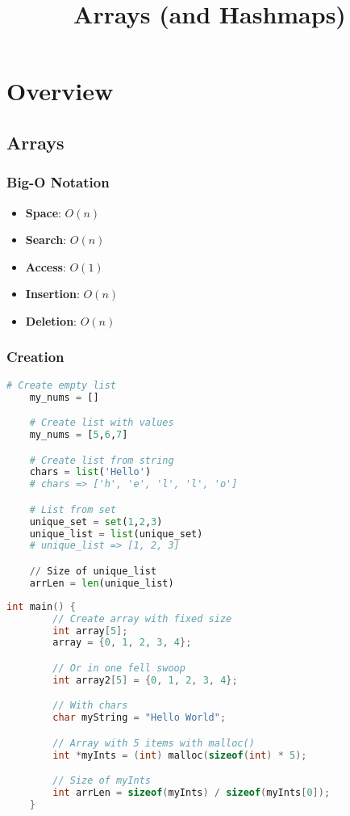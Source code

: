 \documentclass[12pt, letterpaper]{report}
\title{\textbf{\textcolor{ctpPink}{Arrays (and Hashmaps)}}}
\author{\textbf{\color{ctpGreen}{Brandon W}}}
\date{}
\begin{document}
\maketitle

\tableofcontents

\chapter{Overview}

\section{Arrays}
\subsection{Big-O Notation}
\begin{itemize}
    \item \textbf{Space}: \(O(n)\)
    \item \textbf{Search}: \(O(n)\)
    \item \textbf{Access}: \(O(1)\)
    \item \textbf{Insertion}: \(O(n)\)
    \item \textbf{Deletion}: \(O(n)\)
\end{itemize}

\subsection{Creation}

\begin{lstlisting}[language=Python,style=python,caption={Arrays in Python}]
    # Create empty list
    my_nums = []

    # Create list with values
    my_nums = [5,6,7]

    # Create list from string
    chars = list('Hello')
    # chars => ['h', 'e', 'l', 'l', 'o']

    # List from set
    unique_set = set(1,2,3)
    unique_list = list(unique_set)
    # unique_list => [1, 2, 3]

    // Size of unique_list
    arrLen = len(unique_list)
\end{lstlisting}

\pagebreak

\begin{lstlisting}[language=C,style=c,caption={Arrays in C}]
    int main() {
        // Create array with fixed size
        int array[5];
        array = {0, 1, 2, 3, 4};

        // Or in one fell swoop
        int array2[5] = {0, 1, 2, 3, 4};

        // With chars
        char myString = "Hello World";

        // Array with 5 items with malloc()
        int *myInts = (int) malloc(sizeof(int) * 5);

        // Size of myInts
        int arrLen = sizeof(myInts) / sizeof(myInts[0]);
    }
    
\end{lstlisting}
\end{document}
